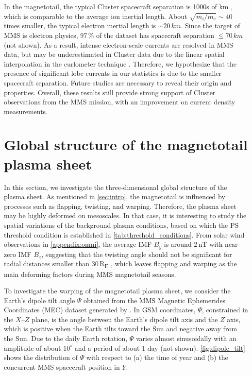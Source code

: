 \documentclass[draft]{agujournal2019}
\begin{document}
In the magnetotail, the typical Cluster spacecraft separation is 1000s of \si{km} \cite{Escoubet2001}, which is comparable to the average ion inertial length. About ${\sqrt{m_i/m_e}\sim40}$ times smaller, the typical electron inertial length is ${\sim20\,\si{km}}$. Since the target of MMS is electron physics, 97\,\% of the dataset has spacecraft separation ${\leq70\,\si{km}}$ (not shown). As a result, intense electron-scale currents are resolved in MMS data, but may be underestimated in Cluster data due to the linear spatial interpolation in the curlometer technique \cite{Paschmann1998}. Therefore, we hypothesize that the presence of significant lobe currents in our statistics is due to the smaller spacecraft separation. Future studies are necessary to reveal their origin and properties. Overall, these results still provide strong support of Cluster observations from the MMS mission, with an improvement on current density measurements.

\section{Global structure of the magnetotail plasma sheet}
\label{sec:global_structure}

In this section, we investigate the three-dimensional global structure of the plasma sheet. As mentioned in \cref{sec:intro}, the magnetotail is influenced by processes such as flapping, twisting, and warping. Therefore, the plasma sheet may be highly deformed on mesoscales. In that case, it is interesting to study the spatial variations of the background plasma conditions, based on which the PS threshold condition is established in \cref{tab:threshold_conditions}. From solar wind observations in \ref{appendix:omni}, the average IMF $B_y$ is around 2\,\si{nT} with near-zero IMF $B_z$, suggesting that the twisting angle should not be significant for radial distances smaller than 30\,\si{R_E} \cite{Tsyganenko2004}, which leaves flapping and warping as the main deforming factors during MMS magnetotail seasons.

To investigate the warping of the magnetotail plasma sheet, we consider the Earth's dipole tilt angle $\Psi$ obtained from the MMS Magnetic Ephemerides Coordinates (MEC) dataset generated by . In GSM coordinates, $\Psi$, constrained in the $X$--$Z$ plane, is the angle between the Earth's dipole tilt axis and the $Z$ axis, which is positive when the Earth tilts toward the Sun and negative away from the Sun. Due to the daily Earth rotation, $\Psi$ varies almost sinusoidally with an amplitude of about ${10^\circ}$ and a period of about 1 day (not shown). \cref{fig:dipole_tilt} shows the distribution of $\Psi$ with respect to (a) the time of year and (b) the concurrent MMS spacecraft position in $Y$.
\end{document}
